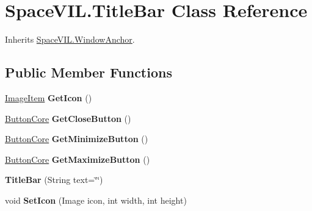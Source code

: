 \hypertarget{class_space_v_i_l_1_1_title_bar}{}\section{Space\+V\+I\+L.\+Title\+Bar Class Reference}
\label{class_space_v_i_l_1_1_title_bar}


Inherits \mbox{\hyperlink{class_space_v_i_l_1_1_window_anchor}{Space\+V\+I\+L.\+Window\+Anchor}}.

\subsection*{Public Member Functions}
\begin{DoxyCompactItemize}
\item 
\mbox{\label{class_space_v_i_l_1_1_title_bar_ac9e6f6019a10739840550125dcdf01e0}} 
\mbox{\hyperlink{class_space_v_i_l_1_1_image_item}{Image\+Item}} {\bfseries Get\+Icon} ()
\item 
\mbox{\label{class_space_v_i_l_1_1_title_bar_ac0f2c2e7fbd3e81c7bf5eea7a216988b}} 
\mbox{\hyperlink{class_space_v_i_l_1_1_button_core}{Button\+Core}} {\bfseries Get\+Close\+Button} ()
\item 
\mbox{\label{class_space_v_i_l_1_1_title_bar_a90009951aeff1f29c887aac28cba19f6}} 
\mbox{\hyperlink{class_space_v_i_l_1_1_button_core}{Button\+Core}} {\bfseries Get\+Minimize\+Button} ()
\item 
\mbox{\label{class_space_v_i_l_1_1_title_bar_a0e5d71f5effe83e1a6edf4a5243b02e8}} 
\mbox{\hyperlink{class_space_v_i_l_1_1_button_core}{Button\+Core}} {\bfseries Get\+Maximize\+Button} ()
\item 
\mbox{\label{class_space_v_i_l_1_1_title_bar_aa07b847218108ae09ab3e7190c8c9bf0}} 
{\bfseries Title\+Bar} (String text=\char`\"{}\char`\"{})
\item 
\mbox{\label{class_space_v_i_l_1_1_title_bar_a74f0ca4e94eda76fba9e15a87c536a23}} 
void {\bfseries Set\+Icon} (Image icon, int width, int height)
\item 

\end{DoxyCompactItemize}
